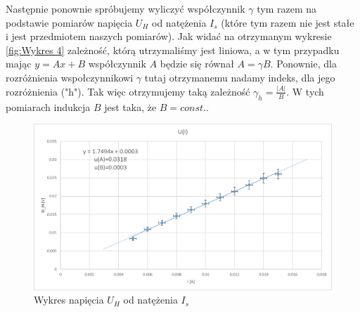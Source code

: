 \documentclass{article}
\begin{document}
\newpage

\par Następnie ponownie spróbujemy wyliczyć współczynnik $\gamma$ tym razem na podstawie pomiarów napięcia $U_{H}$ od natężenia $I_{s}$ (które tym razem nie jest stałe i jest przedmiotem naszych pomiarów). Jak widać na otrzymanym wykresie \ref{fig:Wykres 4} zależność, którą utrzymaliśmy jest liniowa, a w tym przypadku mając $y=Ax+B$ współczynnik $A$ będzie się równał $A=\gamma B$. Ponownie, dla rozróżnienia wspołczynnikowi $\gamma$ tutaj otrzymanemu nadamy indeks, dla jego rozróżnienia ("h"). Tak więc otrzymujemy taką zależność $\gamma_{h}=\frac{|A|}{B}$. W tych pomiarach indukcja $B$ jest taka, że $B=const.$.



\begin{figure}
    \centering
    \includegraphics{U_H_od_I.png}
    \caption{Wykres napięcia $U_{H}$ od natężenia $I_{s}$}
    \label{fig:rys4}
\end{figure}
\end{document}
